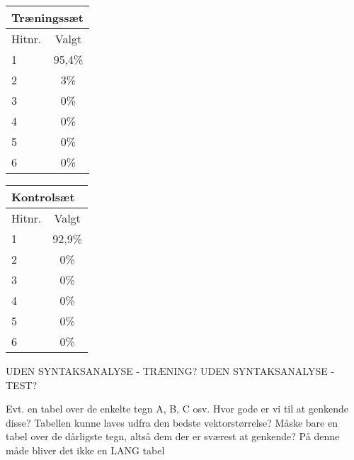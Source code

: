\begin{tabular}{|l|c|}\hline
\multicolumn{2}{|l|}{Træningssæt} \\\hline
Hitnr. & Valgt \\\hline
1 & 95,4\% \\\hline
2 & 3\% \\\hline
3 & 0\% \\\hline
4 & 0\% \\\hline
5 & 0\% \\\hline
6 & 0\% \\\hline \end{tabular}

\begin{tabular}{|l|c|}\hline
\multicolumn{2}{|l|}{Kontrolsæt} \\\hline
Hitnr. & Valgt \\\hline
1 & 92,9\% \\\hline
2 & 0\% \\\hline
3 & 0\% \\\hline
4 & 0\% \\\hline
5 & 0\% \\\hline
6 & 0\% \\\hline \end{tabular}

UDEN SYNTAKSANALYSE - TRÆNING?
UDEN SYNTAKSANALYSE - TEST?

Evt. en tabel over de enkelte tegn A, B, C osv. Hvor gode er vi til at genkende disse? Tabellen kunne laves udfra den bedste vektorstørrelse? Måske bare en tabel over de dårligste tegn, altså dem der er sværest at genkende? På denne måde bliver det ikke en LANG tabel

